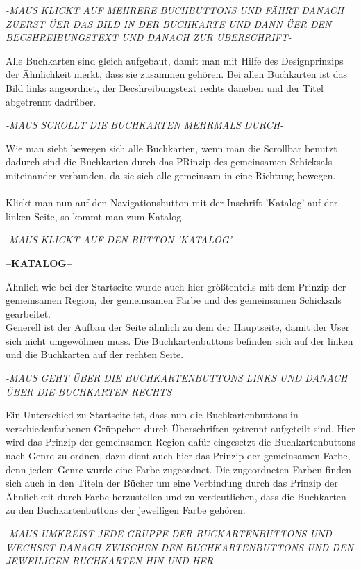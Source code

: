 \documentclass{article}
\begin{document}
\begin{center}
\textit{-MAUS KLICKT AUF MEHRERE BUCHBUTTONS UND FÄHRT DANACH ZUERST ÜER DAS BILD IN DER BUCHKARTE UND DANN ÜER DEN BECSHREIBUNGSTEXT UND DANACH ZUR ÜBERSCHRIFT-}
\end{center}
Alle Buchkarten sind gleich aufgebaut, damit man mit Hilfe des Designprinzips der Ähnlichkeit merkt, dass sie zusammen gehören. Bei allen Buchkarten ist das Bild links angeordnet, der Becshreibungstext rechts daneben und der Titel abgetrennt dadrüber.
\begin{center}
\textit{-MAUS SCROLLT DIE BUCHKARTEN MEHRMALS DURCH-}
\end{center}
Wie man sieht bewegen sich alle Buchkarten, wenn man die Scrollbar benutzt dadurch sind die Buchkarten durch das PRinzip des gemeinsamen Schicksals miteinander verbunden, da sie sich alle gemeinsam in eine Richtung bewegen.\\
\\
Klickt man nun auf den Navigationsbutton mit der Inschrift 'Katalog' auf der linken Seite, so kommt man zum Katalog.
\begin{center}
\textit{-MAUS KLICKT AUF DEN BUTTON 'KATALOG'-}
\end{center}
\begin{center}
\textbf{--KATALOG--}
\end{center}
Ähnlich wie bei der Startseite wurde auch hier größtenteils mit dem Prinzip der gemeinsamen Region, der gemeinsamen Farbe und des gemeinsamen Schicksals gearbeitet.\\
Generell ist der Aufbau der Seite ähnlich zu dem der Hauptseite, damit der User sich nicht umgewöhnen muss. Die Buchkartenbuttons befinden sich auf der linken und die Buchkarten auf der rechten Seite.
\begin{center}
\textit{-MAUS GEHT ÜBER DIE BUCHKARTENBUTTONS LINKS UND DANACH ÜBER DIE BUCHKARTEN RECHTS-}
\end{center}
Ein Unterschied zu Startseite ist, dass nun die Buchkartenbuttons in verschiedenfarbenen Grüppchen durch Überschriften getrennt aufgeteilt sind. Hier wird das Prinzip der gemeinsamen Region dafür eingesetzt die Buchkartenbuttons nach Genre zu ordnen, dazu dient auch hier das Prinzip der gemeinsamen Farbe, denn jedem Genre wurde eine Farbe zugeordnet. Die zugeordneten Farben finden sich auch in den Titeln der Bücher um eine Verbindung durch das Prinzip der Ähnlichkeit durch Farbe herzustellen und zu verdeutlichen, dass die Buchkarten zu den Buchkartenbuttons der jeweiligen Farbe gehören.
\begin{center}
\textit{-MAUS UMKREIST JEDE GRUPPE DER BUCKARTENBUTTONS UND WECHSET DANACH ZWISCHEN DEN BUCHKARTENBUTTONS UND DEN JEWEILIGEN BUCHKARTEN HIN UND HER}
\end{center}
\end{document}
